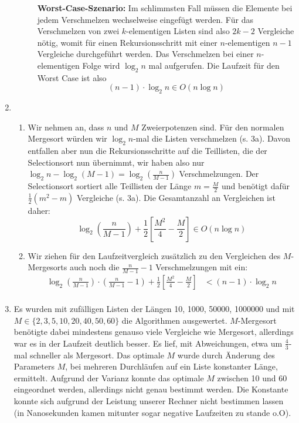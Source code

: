 \documentclass[a4paper,10pt]{scrartcl}
\begin{document}
\begin{enumerate}
\begin{description}
\textbf{Worst-Case-Szenario:}  Im schlimmsten Fall müssen die Elemente bei jedem Verschmelzen wechselweise eingefügt werden.
Für das Verschmelzen von zwei $k$-elementigen Listen sind also $2k-2$ Vergleiche nötig, womit für einen Rekursionsschritt mit einer $n$-elementigen $n - 1$ Vergleiche durchgeführt werden.
Das Verschmelzen bei einer $n$-elementigen Folge wird $\log_2 n$ mal aufgerufen.
Die Laufzeit für den Worst Case ist also
\[
 (n-1) \cdot \log_2 n \in O(n \log n)
\]
      \end{description}
\item \begin{enumerate}
       \item Wir nehmen an, dass $n$ und $M$ Zweierpotenzen sind. Für den normalen Mergesort würden wir $\log_2 n$-mal die Listen verschmelzen (s. 3a). Davon entfallen aber nun die Rekursionsschritte auf die Teillisten, die der Selectionsort nun übernimmt, wir haben also nur $\log_2 n - \log_2 (M-1) = \log_2\left(\frac{n}{M-1}\right)$ Verschmelzungen. Der Selectionsort sortiert alle Teillisten der Länge $m = \frac{M}{2}$ und benötigt dafür $\frac{1}{2}(m^2-m)$ Vergleiche (s. 3a). Die Gesamtanzahl an Vergleichen ist daher:
             \[\log_2\left(\frac{n}{M-1}\right) + \frac{1}{2}\left[\frac{M^2}{4}-\frac{M}{2}\right] \in O(n \log n)\]
       \item Wir ziehen für den Laufzeitvergleich zusätzlich zu den Vergleichen des $M$-Mergesorts auch noch die $\frac{n}{M-1}-1$ Verschmelzungen mit ein:
             \[
             \]
             \begin{align*}
              \log_2\left(\frac{n}{M-1}\right) \cdot \left(\frac{n}{M-1}-1\right) + \frac{1}{2}\left[\frac{M^2}{4}-\frac{M}{2}\right] &< (n-1) \cdot \log_2 n \\
             \end{align*}
      \end{enumerate}
\item Es wurden mit zufälligen Listen der Längen 10, 1000, 50000, 1000000 und mit $M \in \{2,3,5,10,20,40,50,60\}$ die Algorithmen ausgewertet. $M$-Mergesort benötigte dabei mindestens genauso viele Vergleiche wie Mergesort, allerdings war es in der Laufzeit deutlich besser. Es lief, mit Abweichungen, etwa um $\frac{4}{3}$-mal schneller als Mergesort.
Das optimale $M$ wurde durch Änderung des Parameters $M$, bei mehreren Durchläufen auf ein Liste konstanter Länge, ermittelt. Aufgrund der Varianz konnte das optimale $M$ zwischen 10 und 60 eingeordnet werden, allerdings nicht genau bestimmt werden.
Die Konstante konnte sich aufgrund der Leistung unserer Rechner nicht bestimmen lassen (in Nanosekunden kamen mitunter sogar negative Laufzeiten zu stande o.O).
\end{enumerate}
\end{document}
